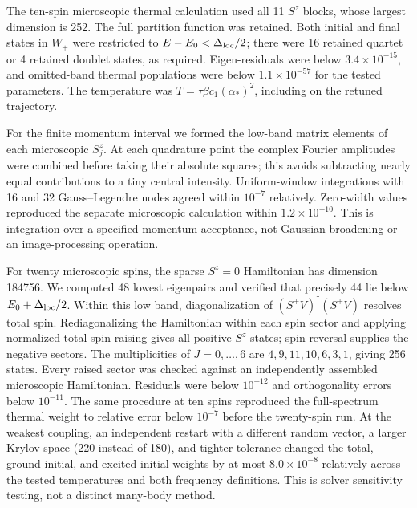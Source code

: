 The ten-spin microscopic thermal calculation used all 11 $S^z$ blocks,
whose largest dimension is 252. The full partition function was retained.
Both initial and final states in $W_+$ were restricted to
$E-E_0<\Delta_{\mathrm{loc}}/2$; there were 16 retained quartet or 4 retained doublet
states, as required. Eigen-residuals were below $3.4\times10^{-15}$,
and omitted-band thermal populations were below $1.1\times10^{-57}$
for the tested parameters. The temperature was
$T=\tau\beta c_1(\alpha_*)^2$, including on the retuned trajectory.

For the finite momentum interval we formed the low-band matrix elements
of each microscopic $S_j^z$. At each quadrature point the complex Fourier
amplitudes were combined before taking their absolute squares; this
avoids subtracting nearly equal contributions to a tiny central intensity.
Uniform-window integrations with 16 and 32 Gauss--Legendre nodes agreed
within $10^{-7}$ relatively. Zero-width values reproduced the separate
microscopic calculation within $1.2\times10^{-10}$. This is integration
over a specified momentum acceptance, not Gaussian broadening or an
image-processing operation.

For twenty microscopic spins, the sparse $S^z=0$ Hamiltonian has dimension
184756. We computed 48 lowest eigenpairs and verified that precisely 44
lie below $E_0+\Delta_{\mathrm{loc}}/2$. Within this low band, diagonalization of
$(S^+V)^\dagger(S^+V)$ resolves total spin. Rediagonalizing the Hamiltonian
within each spin sector and applying normalized total-spin raising gives
all positive-$S^z$ states; spin reversal supplies the negative sectors.
The multiplicities of $J=0,\ldots,6$ are $4,9,11,10,6,3,1$,
giving 256 states. Every raised sector was checked against an independently
assembled microscopic Hamiltonian. Residuals were below $10^{-12}$ and
orthogonality errors below $10^{-11}$. The same procedure at ten spins
reproduced the full-spectrum thermal weight to relative error below
$10^{-7}$ before the twenty-spin run.
At the weakest coupling, an independent restart with a different random
vector, a larger Krylov space (220 instead of 180), and tighter tolerance
changed the total, ground-initial, and excited-initial weights by at most
$8.0\times10^{-8}$ relatively across the tested temperatures and both
frequency definitions. This is solver sensitivity testing, not a distinct
many-body method.

